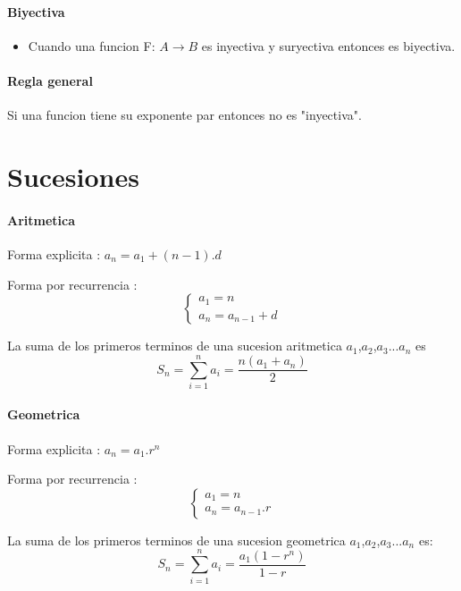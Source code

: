 \documentclass[a4paper]{article}
\begin{document}
\paragraph{Biyectiva}
\begin{itemize}
	\item  Cuando una funcion F: $A \rightarrow B$ es inyectiva y suryectiva entonces es biyectiva. 
\end{itemize}

\paragraph{Regla general}
\begin{description}
	\item Si una funcion tiene su exponente par entonces no es "inyectiva".
\end{description}

\section{Sucesiones}

\paragraph{Aritmetica}
\begin{description}
	\item Forma explicita : $a_n = a_1 + (n-1).d$
	\item Forma por recurrencia :	\begin{equation*}
	\begin{cases}
    	     a_1 = n \\ 
    	     a_n = a_{n-1} + d                
    \end{cases}
\end{equation*}
\end{description}
	La suma de los primeros terminos de una sucesion aritmetica  $a_1$,$a_2$,$a_3$...$a_n$ es
	\begin{equation}
		S_n = \sum_{i=1}^{n}a_i =\frac{n(a_1 + a_n)}{2} 
	\end{equation}	

\paragraph{Geometrica}
\begin{description}
	\item Forma explicita : $a_n = a_1 . r^n$
	\item Forma por recurrencia : \begin{equation*}
	\begin{cases}
    	    a_1 = n \\ 
    	    a_n = a_{n-1} . r	                  
    \end{cases}
\end{equation*}
\end{description}
	La suma de los primeros terminos de una sucesion geometrica  $a_1$,$a_2$,$a_3$...$a_n$ es:
	\begin{equation}
		S_n = \sum_{i=1}^{n}a_i =\frac{a_1(1 - r^n)}{1-r} 
	\end{equation}
\end{document}

